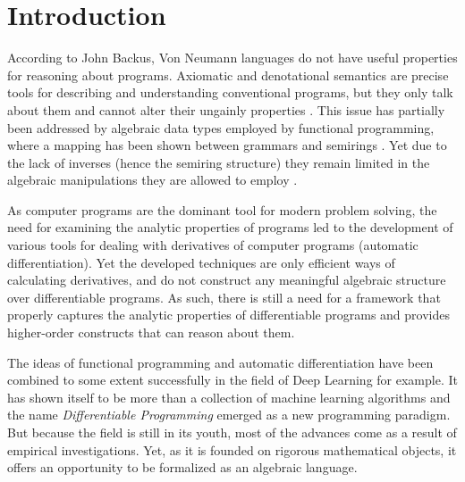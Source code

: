 \section{Introduction}

According to John Backus, Von Neumann languages do not have useful properties for reasoning about programs. Axiomatic and denotational semantics are precise tools for describing and understanding conventional programs, but they only talk about them and cannot alter their ungainly
properties \cite{backus}. This issue has partially been addressed by algebraic data types employed by functional programming, where a mapping has been shown between grammars and semirings \cite{7Trees}.
Yet due to the lack of inverses (hence the semiring structure) they remain limited in the algebraic manipulations they are allowed to employ \cite{complexCat}.

As computer programs are the dominant tool for modern problem solving, the need for examining the analytic properties of programs led to the development of various tools for dealing with derivatives of computer programs (automatic differentiation). Yet the developed techniques are only efficient ways of calculating derivatives, and do not construct any meaningful algebraic structure over differentiable programs. As such, there is still a need for a framework that properly captures the analytic properties of differentiable programs and provides higher-order constructs that can reason about them. 

The ideas of functional programming and automatic differentiation have been combined to some extent successfully in the field of Deep Learning for example. It has shown itself to be more than a collection of machine learning algorithms and the name \emph{Differentiable Programming} emerged as a new programming paradigm. But because the field is still in its youth, most of the advances come as a result of empirical investigations. Yet, as it is founded on rigorous mathematical objects, it offers an opportunity to be formalized as an algebraic language.

